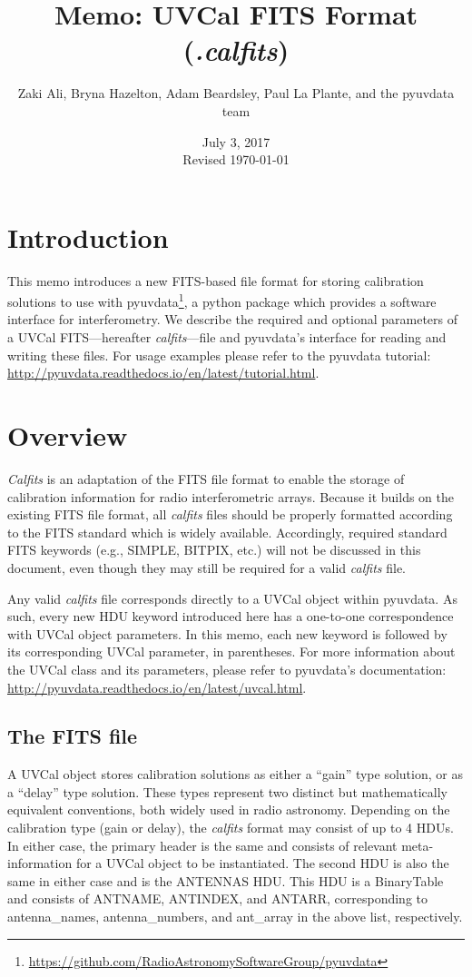 \documentclass[11pt, oneside, english]{article}   	%
\title{Memo: UVCal FITS Format (\emph{.calfits})}
\author{Zaki Ali, Bryna Hazelton, Adam Beardsley, Paul La Plante, and the pyuvdata team}
\date{July 3, 2017\\
 Revised \today}
\begin{document}
\maketitle
\section{Introduction}
This memo introduces a new FITS-based file format for storing calibration solutions to use with pyuvdata\footnote{\url{https://github.com/RadioAstronomySoftwareGroup/pyuvdata}}, a python package which
provides a software interface for interferometry.
We describe the required and optional parameters of a UVCal FITS---hereafter \textit{calfits}---file and pyuvdata's interface for reading and writing these files. 
For usage examples please refer to the pyuvdata tutorial: \url{http://pyuvdata.readthedocs.io/en/latest/tutorial.html}.

\section{Overview}
\textit{Calfits} is an adaptation of the FITS file format to enable the storage of calibration information for radio interferometric arrays. %
Because it builds on the existing FITS file format, all \emph{calfits} files should be properly formatted according to the FITS standard which is widely available.
Accordingly, required standard FITS keywords (e.g., SIMPLE, BITPIX, etc.) will not be discussed in this document, even though they may still be required for a valid \emph{calfits} file.


Any valid \textit{calfits} file corresponds directly to a UVCal object within pyuvdata.
As such, every new HDU keyword introduced here has a one-to-one correspondence with UVCal object parameters.
In this memo, each new keyword is followed by its corresponding UVCal parameter, in parentheses. 
For more information about the UVCal class and its parameters, please refer to pyuvdata's documentation: \url{http://pyuvdata.readthedocs.io/en/latest/uvcal.html}.

\subsection{The FITS file}

A UVCal object stores calibration solutions as either a ``gain'' type solution, or as a ``delay'' type solution.
These types represent two distinct but mathematically equivalent conventions, both widely used in radio astronomy.
Depending on the calibration type (gain or delay), the \textit{calfits} format may consist of up to 4 HDUs. 
In either case, the primary header is the same and consists of relevant meta-information for a UVCal object to be instantiated.
The second HDU is also the same in either case and is the ANTENNAS HDU. 
This HDU is a BinaryTable and consists of ANTNAME, ANTINDEX, and ANTARR, corresponding to antenna\_names, antenna\_numbers, and ant\_array in the above list, respectively. %
\end{document}

